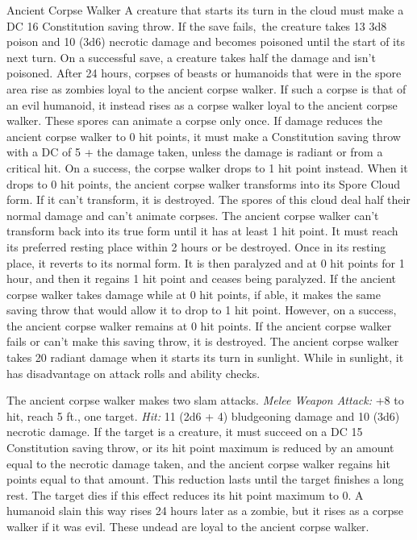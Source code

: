 \documentclass[10pt,a4paper,twoside,twocolumn,openany,bg=print,nodeprecatedcode]{dndbook}
\begin{document}
\begin{DndMonster}[float*=t]{Ancient Corpse Walker}
A creature that starts its turn in the cloud must make a DC 16 Constitution saving throw. If the save fails, the creature takes 13 3d8 poison and 10 (3d6) necrotic damage and becomes poisoned until the start of its next turn. On a successful save, a creature takes half the damage and isn't poisoned.
After 24 hours, corpses of beasts or humanoids that were in the spore area rise as zombies loyal to the ancient corpse walker. If such a corpse is that of an evil humanoid, it instead rises as a corpse walker loyal to the ancient corpse walker. These spores can animate a corpse only once.
If damage reduces the ancient corpse walker to 0 hit points, it must make a Constitution saving throw with a DC of 5 + the damage taken, unless the damage is radiant or from a critical hit. On a success, the corpse walker drops to 1 hit point instead.
When it drops to 0 hit points, the ancient corpse walker transforms into its Spore Cloud form. If it can't transform, it is destroyed. The spores of this cloud deal half their normal damage and can't animate corpses.
The ancient corpse walker can't transform back into its true form until it has at least 1 hit point. It must reach its preferred resting place within 2 hours or be destroyed. Once in its resting place, it reverts to its normal form.
It is then paralyzed and at 0 hit points for 1 hour, and then it regains 1 hit point and ceases being paralyzed.
If the ancient corpse walker takes damage while at 0 hit points, if able, it makes the same saving throw that would allow it to drop to 1 hit point. However, on a success, the ancient corpse walker remains at 0 hit points. If the ancient corpse walker fails or can't make this saving throw, it is destroyed.
The ancient corpse walker takes 20 radiant damage when it starts its turn in sunlight. While in sunlight, it has disadvantage on attack rolls and ability checks.
\par
{}
The ancient corpse walker makes two slam attacks.
\textsl{Melee Weapon Attack:} +8 to hit, reach 5 ft., one target. \textsl{Hit:} 11 (2d6 + 4) bludgeoning damage and 10 (3d6) necrotic damage. If the target is a creature, it must succeed on a DC 15 Constitution saving throw, or its hit point maximum is reduced by an amount equal to the necrotic damage taken, and the ancient corpse walker regains hit points equal to that amount. This reduction lasts until the target finishes a long rest. The target dies if this effect reduces its hit point maximum to 0. A humanoid slain this way rises 24 hours later as a zombie, but it rises as a corpse walker if it was evil. These undead are loyal to the ancient corpse walker.
\end{DndMonster}
\end{document}
